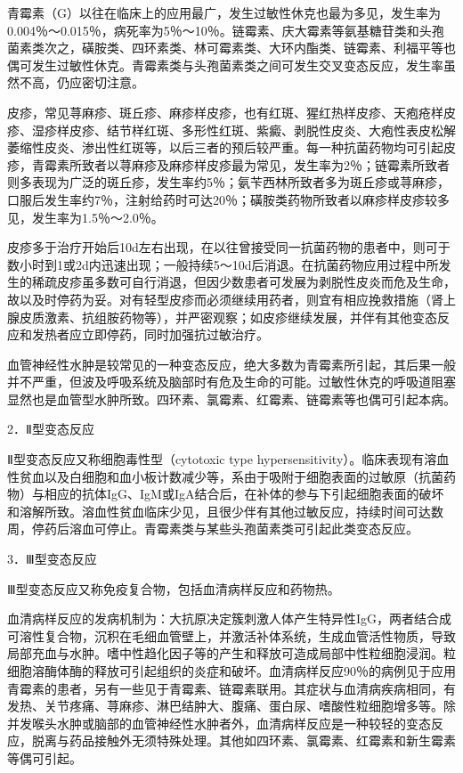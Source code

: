 青霉素（G）以往在临床上的应用最广，发生过敏性休克也最为多见，发生率为0.004％～0.015％，病死率为5％～10％。链霉素、庆大霉素等氨基糖苷类和头孢菌素类次之，磺胺类、四环素类、林可霉素类、大环内酯类、链霉素、利福平等也偶可发生过敏性休克。青霉素类与头孢菌素类之间可发生交叉变态反应，发生率虽然不高，仍应密切注意。

皮疹，常见荨麻疹、斑丘疹、麻疹样皮疹，也有红斑、猩红热样皮疹、天疱疮样皮疹、湿疹样皮疹、结节样红斑、多形性红斑、紫癜、剥脱性皮炎、大疱性表皮松解萎缩性皮炎、渗出性红斑等，以后三者的预后较严重。每一种抗菌药物均可引起皮疹，青霉素所致者以荨麻疹及麻疹样皮疹最为常见，发生率为2％；链霉素所致者则多表现为广泛的斑丘疹，发生率约5％；氨苄西林所致者多为斑丘疹或荨麻疹，口服后发生率约7％，注射给药时可达20％；磺胺类药物所致者以麻疹样皮疹较多见，发生率为1.5％～2.0％。

皮疹多于治疗开始后10d左右出现，在以往曾接受同一抗菌药物的患者中，则可于数小时到1或2d内迅速出现；一般持续5～10d后消退。在抗菌药物应用过程中所发生的稀疏皮疹虽多数可自行消退，但因少数患者可发展为剥脱性皮炎而危及生命，故以及时停药为妥。对有轻型皮疹而必须继续用药者，则宜有相应挽救措施（肾上腺皮质激素、抗组胺药物等），并严密观察；如皮疹继续发展，并伴有其他变态反应和发热者应立即停药，同时加强抗过敏治疗。

血管神经性水肿是较常见的一种变态反应，绝大多数为青霉素所引起，其后果一般并不严重，但波及呼吸系统及脑部时有危及生命的可能。过敏性休克的呼吸道阻塞显然也是血管型水肿所致。四环素、氯霉素、红霉素、链霉素等也偶可引起本病。

2．Ⅱ型变态反应

Ⅱ型变态反应又称细胞毒性型（cytotoxic type
hypersensitivity）。临床表现有溶血性贫血以及白细胞和血小板计数减少等，系由于吸附于细胞表面的过敏原（抗菌药物）与相应的抗体IgG、IgM或IgA结合后，在补体的参与下引起细胞表面的破坏和溶解所致。溶血性贫血临床少见，且很少伴有其他过敏反应，持续时间可达数周，停药后溶血可停止。青霉素类与某些头孢菌素类可引起此类变态反应。

3．Ⅲ型变态反应

Ⅲ型变态反应又称免疫复合物，包括血清病样反应和药物热。

血清病样反应的发病机制为：大抗原决定簇刺激人体产生特异性IgG，两者结合成可溶性复合物，沉积在毛细血管壁上，并激活补体系统，生成血管活性物质，导致局部充血与水肿。嗜中性趋化因子等的产生和释放可造成局部中性粒细胞浸润。粒细胞溶酶体酶的释放可引起组织的炎症和破坏。血清病样反应90％的病例见于应用青霉素的患者，另有一些见于青霉素、链霉素联用。其症状与血清病疾病相同，有发热、关节疼痛、荨麻疹、淋巴结肿大、腹痛、蛋白尿、嗜酸性粒细胞增多等。除并发喉头水肿或脑部的血管神经性水肿者外，血清病样反应是一种较轻的变态反应，脱离与药品接触外无须特殊处理。其他如四环素、氯霉素、红霉素和新生霉素等偶可引起。

